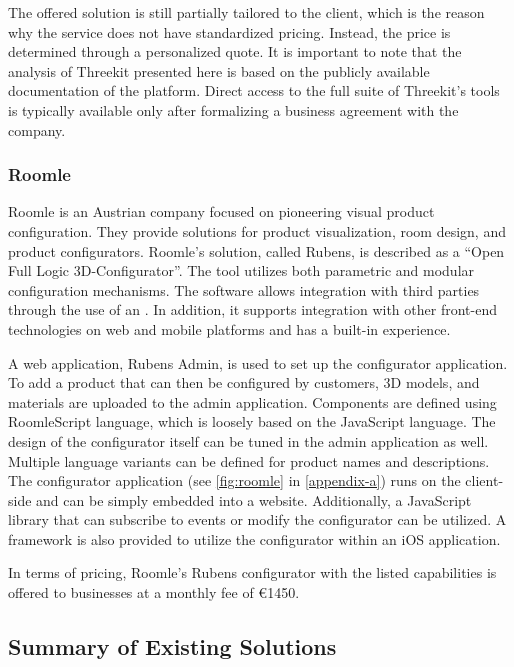 The offered solution is still partially tailored to the client, which is the reason why the service does not have standardized pricing. Instead, the price is determined through a personalized quote. It is important to note that the analysis of Threekit presented here is based on the publicly available documentation of the platform. Direct access to the full suite of Threekit's tools is typically available only after formalizing a business agreement with the company.


\subsubsection{Roomle}

Roomle is an Austrian company focused on pioneering visual product configuration. They provide solutions for product visualization, room design, and product configurators. Roomle's solution, called Rubens, is described as a \enquote{Open Full Logic 3D-Configurator}. The tool utilizes both parametric and modular configuration mechanisms. The software allows integration with third parties through the use of an . In addition, it supports integration with other front-end technologies on web and mobile platforms and has a built-in  experience.~\cite{RoomleAbout}

A web application, Rubens Admin, is used to set up the configurator application. To add a product that can then be configured by customers, 3D models, and materials are uploaded to the admin application. Components are defined using RoomleScript language, which is loosely based on the JavaScript language. The design of the configurator itself can be tuned in the admin application as well. Multiple language variants can be defined for product names and descriptions. The configurator application (see \autoref{fig:roomle} in \autoref{appendix-a}) runs on the client-side and can be simply embedded into a website. Additionally, a JavaScript library that can subscribe to events or modify the configurator can be utilized. A framework is also provided to utilize the configurator within an iOS application.~\cite{RoomleDocumentation}

In terms of pricing, Roomle's Rubens configurator with the listed capabilities is offered to businesses at a monthly fee of €1450.~\cite{RoomleFullLogic}

\subsection{Summary of Existing Solutions}


